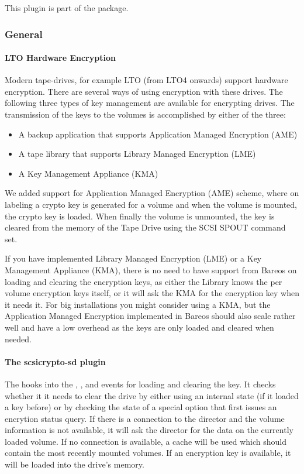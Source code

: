 This plugin is part of the  package.

\subsubsection{General}

\paragraph{LTO Hardware Encryption}
\label{LTOHardwareEncryptionGeneral}

Modern tape-drives, for example LTO (from LTO4 onwards) support hardware encryption.
There are several ways of using encryption with these drives. The following three types of key management are available for encrypting drives. The transmission of the keys to the volumes is accomplished by either of the three:

\begin{itemize}
 \item A backup application that supports Application Managed Encryption (AME)
 \item A tape library that supports Library Managed Encryption (LME)
 \item A Key Management Appliance (KMA)
\end{itemize}

We added support for Application Managed Encryption (AME) scheme, where on labeling a crypto key is generated for a volume and when the volume is mounted, the crypto key is loaded. When finally the volume is unmounted, the key is cleared from the memory of the Tape Drive using the SCSI SPOUT command set.

If you have implemented Library Managed Encryption (LME) or a Key Management Appliance (KMA), there is no need to have support from Bareos on loading and clearing the encryption keys, as either the Library knows the per volume encryption keys itself, or it will ask the KMA for the encryption key when it needs it. For big installations you might consider using a KMA, but the Application Managed Encryption implemented in Bareos should also scale rather well and have a low overhead as the keys are only loaded and cleared when needed.

\paragraph{The scsicrypto-sd plugin}

The  hooks into the , ,  and  events for loading and clearing the key. It checks whether it it needs to clear the drive by either using an internal state (if it loaded a key before) or by checking the state of a special option that first issues an encrytion status query. If there is a connection to the director and the volume information is not available, it will ask the director for the data on the currently loaded volume. If no connection is available, a cache will be used which should contain the most recently mounted volumes. If an encryption key is available, it will be loaded into the drive's memory.

